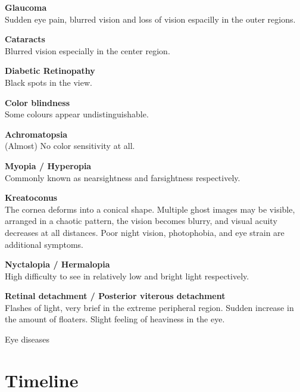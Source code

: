 \documentclass{acm_proc_article-sp}
\begin{document}
\begin{table}
    \textbf{Glaucoma}\\
    Sudden eye pain, blurred vision and loss of vision espacilly in the
    outer regions.

    \vspace{1em}\textbf{Cataracts}\\
    Blurred vision especially in the center region.

    \vspace{1em}\textbf{Diabetic Retinopathy}\\
    Black spots in the view.

    \vspace{1em}\textbf{Color blindness}\\
    Some colours appear undistinguishable.

    \vspace{1em}\textbf{Achromatopsia}\\
    (Almost) No color sensitivity at all.

    \vspace{1em}\textbf{Myopia / Hyperopia}\\
    Commonly known as nearsightness and farsightness respectively.

    \vspace{1em}\textbf{Kreatoconus}\\
    The cornea deforms into a conical shape.
    Multiple ghost images may be visible, arranged in a chaotic pattern,
    the vision becomes blurry, and visual acuity decreases at all distances.
    Poor night vision, photophobia, and eye strain are additional symptoms.

    \vspace{1em}\textbf{Nyctalopia / Hermalopia}\\
    High difficulty to see in relatively low and bright light respectively.

    \vspace{1em}\textbf{Retinal detachment / Posterior viterous detachment}\\
    Flashes of light, very brief in the extreme peripheral region.
    Sudden increase in the amount of floaters.
    Slight feeling of heaviness in the eye.
    \caption{Eye diseases}
    \label{tab:eye_diseases}
\end{table}

\section{Timeline}
\end{document}

